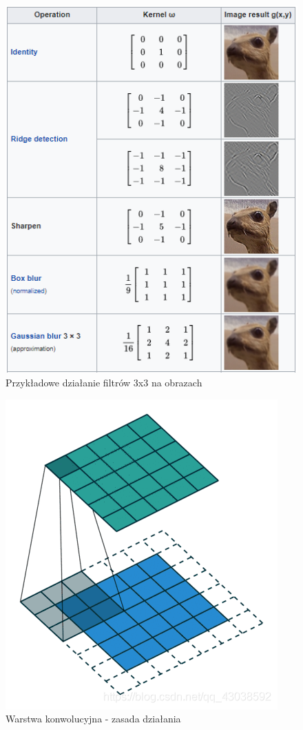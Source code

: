 \documentclass[a4paper,12pt,oneside]{book} %
\begin{document}
\begin{figure}[h]
	\centering
	\includegraphics[scale=0.9]{conv_filter.png}
	\caption{Przykładowe działanie filtrów 3x3 na obrazach\cite{wikipedia_filterkernel}}
	\label{conv_filter}
\end{figure}

\begin{figure}[h]
	\centering
	\includegraphics[scale=0.4]{conv.png}
	\caption{Warstwa konwolucyjna - zasada działania\cite{developpapercom_2021}}
	\label{conv_img}
\end{figure}
\end{document}
